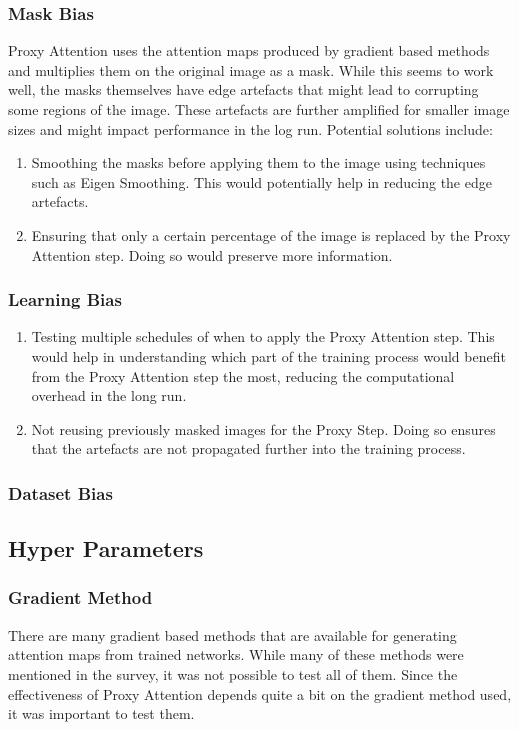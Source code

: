 \subsubsection{Mask Bias}
Proxy Attention uses the attention maps produced by gradient based methods and multiplies them on the original image as a mask. While this seems to work well, the masks themselves have edge artefacts that might lead to corrupting some regions of the image. These artefacts are further amplified for smaller image sizes and might impact performance in the log run.
Potential solutions include:

\begin{enumerate}
    \item Smoothing the masks before applying them to the image using techniques such as Eigen Smoothing. This would potentially help in reducing the edge artefacts.
    \item Ensuring that only a certain percentage of the image is replaced by the Proxy Attention step. Doing so would preserve more information. 
\end{enumerate}

\subsubsection{Learning Bias}

\begin{enumerate}
    \item Testing multiple schedules of when to apply the Proxy Attention step. This would help in understanding which part of the training process would benefit from the Proxy Attention step the most, reducing the computational overhead in the long run.
    \item Not reusing previously masked images for the Proxy Step. Doing so ensures that the artefacts are not propagated further into the training process.
\end{enumerate}

\subsubsection{Dataset Bias}

\subsection{Hyper Parameters} \label{sec:hyperparameters}

\subsubsection{Gradient Method}
There are many gradient based methods that are available for generating attention maps from trained networks. While many of these methods were mentioned in the survey, it was not possible to test all of them. Since the effectiveness of Proxy Attention depends quite a bit on the gradient method used, it was important to test them.

